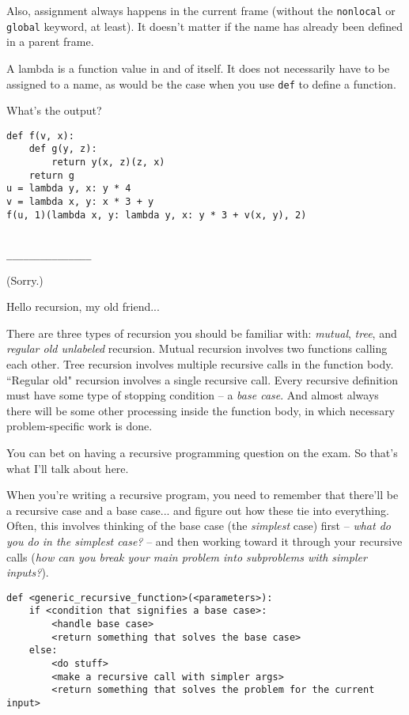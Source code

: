 \documentclass[twoside]{article}
\begin{document}
\begin{enumerate}
Also, assignment always happens in the current frame (without the \texttt{nonlocal} or \texttt{global} keyword, at least). It doesn't matter if the name has already been defined in a parent frame.

A lambda is a function value in and of itself. It does not necessarily have to be assigned to a name, as would be the case when you use \texttt{def} to define a function.

\begin{enumerate}
 What's the output?
\begin{lstlisting}
def f(v, x):
    def g(y, z):
        return y(x, z)(z, x)
    return g
u = lambda y, x: y * 4
v = lambda x, y: x * 3 + y
f(u, 1)(lambda x, y: lambda y, x: y * 3 + v(x, y), 2)
\end{lstlisting}
~\\
\lstinline{_______________}

\end{enumerate}

(Sorry.)


Hello recursion, my old friend...

There are three types of recursion you should be familiar with: \textit{mutual}, \textit{tree}, and \textit{regular old unlabeled} recursion. Mutual recursion involves two functions calling each other. Tree recursion involves multiple recursive calls in the function body. ``Regular old" recursion involves a single recursive call. Every recursive definition must have some type of stopping condition -- a \textit{base case}. And almost always there will be some other processing inside the function body, in which necessary problem-specific work is done.

You can bet on having a recursive programming question on the exam. So that's what I'll talk about here.

When you're writing a recursive program, you need to remember that there'll be a recursive case and a base case... and figure out how these tie into everything. Often, this involves thinking of the base case (the \textit{simplest} case) first -- \textit{what do you do in the simplest case?} -- and then working toward it through your recursive calls (\textit{how can you break your main problem into subproblems with simpler inputs?}).

\begin{lstlisting}
def <generic_recursive_function>(<parameters>):
    if <condition that signifies a base case>:
        <handle base case>
        <return something that solves the base case>
    else:
        <do stuff>
        <make a recursive call with simpler args>
        <return something that solves the problem for the current input>
\end{lstlisting}


\end{enumerate}
\end{document}
